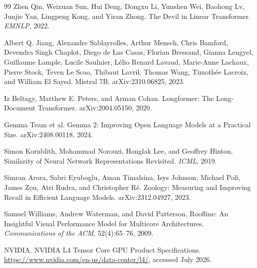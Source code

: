 \documentclass[11pt,a4paper]{article}
\theoremstyle{definition}
\theoremstyle{plain}
\begin{document}
\begin{thebibliography}{99}
Zhen Qin, Weixuan Sun, Hui Deng, Dongxu Li, Yunshen Wei, Baohong Lv, Junjie Yan, Lingpeng Kong, and Yiran Zhong.
\newblock The Devil in Linear Transformer.
\newblock \emph{EMNLP}, 2022.

Albert Q. Jiang, Alexandre Sablayrolles, Arthur Mensch, Chris Bamford, Devendra Singh Chaplot, Diego de Las Casas, Florian Bressand, Gianna Lengyel, Guillaume Lample, Lucile Saulnier, L\'{e}lio Renard Lavaud, Marie-Anne Lachaux, Pierre Stock, Teven Le Scao, Thibaut Lavril, Thomas Wang, Timoth\'{e}e Lacroix, and William El Sayed.
\newblock Mistral 7B.
\newblock arXiv:2310.06825, 2023.

Iz Beltagy, Matthew E. Peters, and Arman Cohan.
\newblock Longformer: The Long-Document Transformer.
\newblock arXiv:2004.05150, 2020.



Gemma Team et al.
\newblock Gemma 2: Improving Open Language Models at a Practical Size.
\newblock arXiv:2408.00118, 2024.

Simon Kornblith, Mohammad Norouzi, Honglak Lee, and Geoffrey Hinton.
\newblock Similarity of Neural Network Representations Revisited.
\newblock \emph{ICML}, 2019.

Simran Arora, Sabri Eyuboglu, Aman Timalsina, Isys Johnson, Michael Poli, James Zou, Atri Rudra, and Christopher R\'e.
\newblock Zoology: Measuring and Improving Recall in Efficient Language Models.
\newblock arXiv:2312.04927, 2023.

Samuel Williams, Andrew Waterman, and David Patterson.
\newblock Roofline: An Insightful Visual Performance Model for Multicore Architectures.
\newblock \emph{Communications of the ACM}, 52(4):65--76, 2009.

NVIDIA.
\newblock NVIDIA L4 Tensor Core GPU Product Specifications.
\newblock \url{https://www.nvidia.com/en-us/data-center/l4/}, accessed July 2026.


\end{thebibliography}

\end{document}
